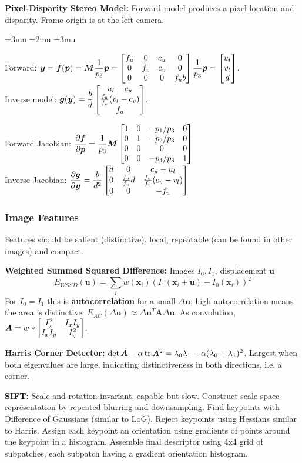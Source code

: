 \documentclass[twocolumn, 8pt]{extarticle}
\newenvironment{tight}
  {\begingroup
   \setlength{\arraycolsep}{2pt}
   \thinmuskip=3mu       %
   \medmuskip=2mu        %
   \thickmuskip=3mu      %
  }
  {
    \endgroup
  }
\begin{document}
\textbf{Pixel-Disparity Stereo Model:} Forward model produces a pixel location and disparity. Frame origin is at the
left camera.

\begin{tight}
  Forward: \(\displaystyle \bm y = \bm f(\bm p) = \bm M\frac{1}{p_3}\bm p = \mat{\mrow{f_u}{0}{c_u}{0}\mrow{0}{f_v}{c_v}{0}\mrow{0}{0}{0}{f_ub}}\frac{1}{p_3}\bm p = \cvec{u_l}{v_l}{d}\). \\
\end{tight}
Inverse model: \(\displaystyle \bm g(\bm y) = \frac{b}{d}\cvec{u_l - c_u}{\frac{f_u}{f_v}(v_l - c_v)}{f_u}\).

Forward Jacobian: \(\displaystyle \pdiff{\bm f}{\bm p} = \frac{1}{p_3}\bm M\matfour{1}{0}{-p_1/p_3}{0}{0}{1}{-p_2/p_3}{0}{0}{0}{0}{0}{0}{0}{-p_4/p_3}{1}\) \\
Inverse Jacobian: \(\displaystyle \pdiff{\bm g}{\bm y} = \frac{b}{d^2}\matthree{d}{0}{c_u - u_l}{0}{\frac{f_u}{f_v}d}{\frac{f_u}{f_v}(c_v - v_l)}{0}{0}{-f_u}\)

\subsubsection{Image Features}

Features should be salient (distinctive), local, repeatable (can be found in other images) and compact.

\textbf{Weighted Summed Squared Difference:} Images \(I_0, I_1\), displacement \(\bm u\)
\[
E_{WSSD}(\bm u) = \sum _i w(\bm x_i)(I_1(\bm x_i + \bm u) - I_0(\bm x_i))^2
\]
For \(I_0 = I_1\) this is \textbf{autocorrelation} for a small \(\Delta\bm u\); high autocorrelation means the area is
distinctive. \(E_{AC}(\Delta\bm u) \approx \Delta\bm u^T\bm A\Delta\bm u\).
As convolution, \(\bm A = w * \begin{bmatrix} {I_x^2} & {I_xI_y} \\ {I_xI_y} & {I_y^2} \end{bmatrix}\).

\textbf{Harris Corner Detector:} \(\det\bm A - \alpha\operatorname{tr}\bm A^2 = \lambda _0\lambda _1 - \alpha(\lambda _0 + \lambda _1)^2\).
Largest when both eigenvalues are large, indicating distinctiveness in both directions, i.e. a corner.

\textbf{SIFT:} Scale and rotation invariant, capable but slow. Construct scale space representation by repeated blurring
and downsampling. Find keypoints with Difference of Gaussians (similar to LoG). Reject keypoints using Hessians similar
to Harris. Assign each keypoint an orientation using gradients of points around the keypoint in a histogram. Assemble
final descriptor using 4x4 grid of subpatches, each subpatch having a gradient orientation histogram.
\end{document}
